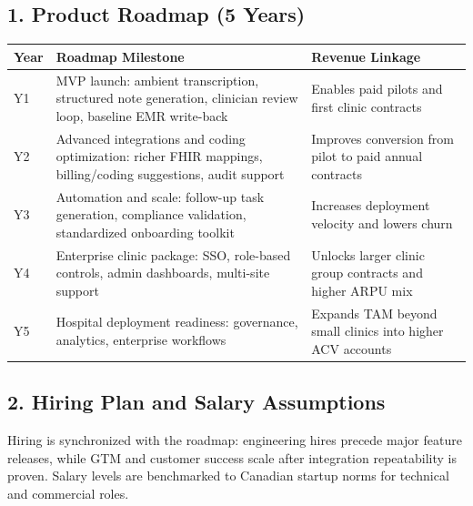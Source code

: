 \documentclass[11pt]{article}
\begin{document}
\subsection*{1. Product Roadmap (5 Years)}
\begin{center}
\begin{tabular}{p{} p{} p{}}
\toprule
\textbf{Year} & \textbf{Roadmap Milestone} & \textbf{Revenue Linkage} \\
\midrule
Y1 & MVP launch: ambient transcription, structured note generation, clinician review loop, baseline EMR write-back & Enables paid pilots and first clinic contracts \\
Y2 & Advanced integrations and coding optimization: richer FHIR mappings, billing/coding suggestions, audit support & Improves conversion from pilot to paid annual contracts \\
Y3 & Automation and scale: follow-up task generation, compliance validation, standardized onboarding toolkit & Increases deployment velocity and lowers churn \\
Y4 & Enterprise clinic package: SSO, role-based controls, admin dashboards, multi-site support & Unlocks larger clinic group contracts and higher ARPU mix \\
Y5 & Hospital deployment readiness: governance, analytics, enterprise workflows & Expands TAM beyond small clinics into higher ACV accounts \\
\bottomrule
\end{tabular}
\end{center}

\subsection*{2. Hiring Plan and Salary Assumptions}
Hiring is synchronized with the roadmap: engineering hires precede major feature releases, while GTM and customer success scale after integration repeatability is proven. Salary levels are benchmarked to Canadian startup norms for technical and commercial roles.
\end{document}
